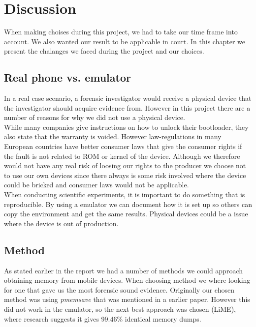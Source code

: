 \section{Discussion}
When making choises during this project, we had to take our time frame into account. 
We also wanted our result to be applicable in court. In this chapter we present the 
chalanges we faced during the project and our choices.

\subsection{Real phone vs. emulator}
In a real case scenario, a forensic investigator would receive a physical device 
that the investigator should acquire evidence from. However in this project there 
are a number of reasons for why we did not use a physical device.\\

While many companies give instructions on how to unlock their bootloader, they also 
state that the warranty is voided. However law-regulations in many European countries 
have better consumer laws that give the consumer rights if the fault %
is not related to ROM or kernel of the device. Although we therefore would not have 
any real risk of loosing our rights to the producer we choose not to use our own 
devices since there always is some risk involved where the device could be bricked 
and consumer laws would not be applicable.\\

When conducting scientific experiments, it is important to do something that is 
reproducible. By using a emulator we can document how it is set up so others can 
copy the environment and get the same results. Physical devices could be a issue 
where the device is out of production.

\subsection{Method}
As stated earlier in the report we had a number of methods we could approach 
obtaining memory from mobile devices. When choosing method we where looking for one 
that gave us the most forensic sound evidence. Originally our chosen method was 
using \textit{pmemsave} %
that was mentioned in a earlier paper\cite{acq_vol_android_mem}. However this did 
not work in the emulator, so the next best approach was chosen (LiME), where research suggests 
it gives 99.46\% identical memory dumps\cite{acq_vol_android_mem}.


